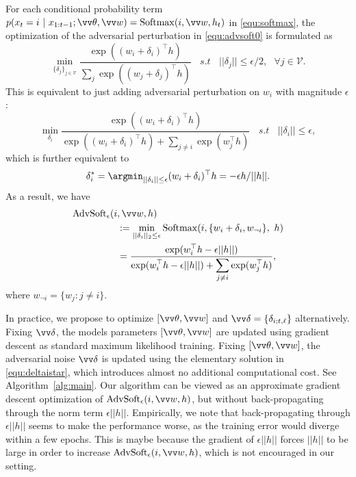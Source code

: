 \documentclass{article}
\newcommand{\softmax}{{\mathrm{Softmax}}}
\newcommand{\ours}{{\mathrm{AdvSoft}}}
\newcommand{\advsoft}{\ours}
\begin{document}
\begin{thm}\label{thm:advh}
For each conditional probability term
$p(x_t=i ~|~x_{1:t-1}; \vv\theta, \vv w) 
= \softmax(i, \vv w, h_t)$  in \eqref{equ:softmax},
the optimization of the adversarial perturbation in \eqref{equ:advsoft0} is formulated as  
$$
\min_{\{\delta_j\}_{j\in \mathcal V}}  \frac{\displaystyle\exp((w_i + \delta_i)^\top h)}{\displaystyle\sum_j \exp((w_j + \delta_j)^\top h)}~~~~s.t~~~~ ||\delta_j||\leq \epsilon/2,~~~\forall j\in\mathcal V. 
$$
This is equivalent to just adding adversarial perturbation on $w_i$  
with magnitude $\epsilon$:
$$
\min_{\delta_i}  \frac{\displaystyle\exp((w_i + \delta_i)^\top h)}{\displaystyle
\exp((w_i + \delta_i)^\top h) + \sum_{j\neq i} \exp(w_j^\top h)}~~~~s.t~~~~ ||\delta_i||\leq \epsilon, 
$$
which is further equivalent to 
\begin{align}\label{equ:deltaistar}
\delta_i^* = \argmin_{||\delta_i||
\leq \epsilon }  (w_i + \delta_i)^\top h = - \epsilon h/||h||. 
\end{align}
As a result, we have \begin{align}\label{equ:advsoft} 
\begin{split}
& {\advsoft}_\epsilon(i, \vv w,h) \\
&~~~~~~~~~~~~~~  :=  \min_{||\delta_i||_2\leq\epsilon} \softmax(i, \{w_i+\delta_i, w_{\neg i}\}, ~ h) \\
&~~~~~~~~~~~~~~   = \frac{\displaystyle\exp(w_i^\top h-\epsilon||h||)}{\displaystyle
\exp(w_i^\top h-\epsilon||h||) + \sum_{j\neq i} \exp(w_j^\top h)},
\end{split}
\end{align}
where $w_{\neg i} = 
\{w_j \colon  j\neq i\}$. 
\end{thm}


In practice, we propose to optimize $[\vv\theta, \vv w]$ and $\vv \delta = \{\delta_{i;t,\ell}\}$ alternatively.  Fixing $\vv\delta$, the models parameters $[\vv\theta,\vv w]$  
are updated using  gradient descent as standard maximum likelihood training. 
Fixing $[\vv\theta, \vv w]$, 
the adversarial noise $\vv \delta$ is updated using the elementary solution in 
\eqref{equ:deltaistar}, which introduces almost no additional computational cost. 
See Algorithm~\ref{alg:main}. 
Our algorithm can be viewed as an approximate gradient descent optimization of    
$\mathrm{AdvSoft}_\epsilon(i,\vv w,h)$, but without back-propagating through the norm term $\epsilon ||h||$. Empirically, we note that back-propagating through $\epsilon ||h||$ 
seems to make the performance worse, as
the training error would diverge within a few epochs.
This is maybe because the gradient of $\epsilon ||h||$ forces $||h||$ to be large in order to increase $\mathrm{AdvSoft}_\epsilon(i, \vv w,h)$, which is not encouraged in our setting.
\end{document}
